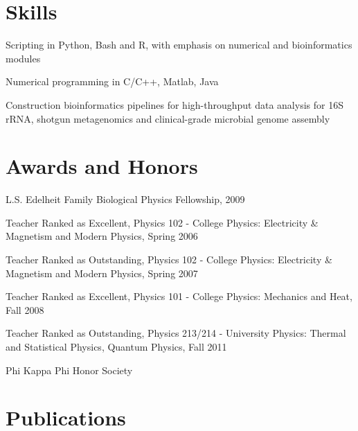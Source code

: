 \documentclass[letterpaper]{article}
\renewenvironment{itemize}{
  \begin{list}{}{
    \setlength{\leftmargin}{1.5em}
  }
}{
  \end{list}
}
\begin{document}
\section*{Skills}
\begin{itemize}
    \item Scripting in Python, Bash and R, with emphasis on numerical and bioinformatics modules
    \item Numerical programming in C/C++, Matlab, Java
    \item Construction bioinformatics pipelines for high-throughput
    data analysis for 16S rRNA, shotgun metagenomics and clinical-grade microbial genome assembly
\end{itemize}


\section*{Awards and Honors}
\begin{itemize}
  \item L.S. Edelheit Family Biological Physics Fellowship, 2009
  \item Teacher Ranked as Excellent, Physics 102 - College Physics: Electricity
  \& Magnetism and Modern Physics, Spring 2006
  \item Teacher Ranked as Outstanding, Physics 102 - College Physics: Electricity
  \& Magnetism and Modern Physics, Spring 2007
  \item Teacher Ranked as Excellent, Physics 101 - College Physics: Mechanics
  and Heat, Fall 2008
  \item Teacher Ranked as Outstanding, Physics 213/214 - University Physics: Thermal
  and Statistical Physics, Quantum Physics, Fall 2011
  \item Phi Kappa Phi Honor Society
\end{itemize}

\section*{Publications}
\end{document}
